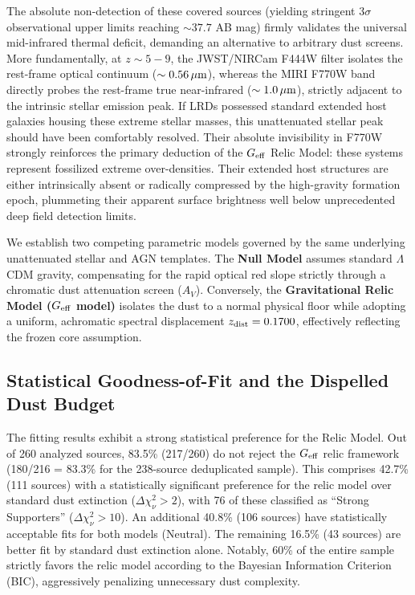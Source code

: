 \documentclass[twocolumn]{aastex631}
\begin{document}
The absolute non-detection of these covered sources (yielding stringent $3\sigma$ observational upper limits reaching $\sim 37.7$ AB mag) firmly validates the universal mid-infrared thermal deficit, demanding an alternative to arbitrary dust screens. More fundamentally, at $z \sim 5-9$, the JWST/NIRCam F444W filter isolates the rest-frame optical continuum ($\sim 0.56\rm\,\mu m$), whereas the MIRI F770W band directly probes the rest-frame true near-infrared ($\sim 1.0\rm\,\mu m$), strictly adjacent to the intrinsic stellar emission peak. If LRDs possessed standard extended host galaxies housing these extreme stellar masses, this unattenuated stellar peak should have been comfortably resolved. Their absolute invisibility in F770W strongly reinforces the primary deduction of the $G_{\rm eff}$ Relic Model: these systems represent fossilized extreme over-densities. Their extended host structures are either intrinsically absent or radically compressed by the high-gravity formation epoch, plummeting their apparent surface brightness well below unprecedented deep field detection limits. 

We establish two competing parametric models governed by the same underlying unattenuated stellar and AGN templates. The \textbf{Null Model} assumes standard $\Lambda$CDM gravity, compensating for the rapid optical red slope strictly through a chromatic dust attenuation screen ($A_V$). Conversely, the \textbf{Gravitational Relic Model ($G_{\rm eff}$ model)} isolates the dust to a normal physical floor while adopting a uniform, achromatic spectral displacement $z_{\rm dist} = 0.1700$, effectively reflecting the frozen core assumption.  

\subsection{Statistical Goodness-of-Fit and the Dispelled Dust Budget}

The fitting results exhibit a strong statistical preference for the Relic Model. Out of 260 analyzed sources, 83.5\% (217/260) do not reject the $G_{\rm eff}$ relic framework (180/216 = 83.3\% for the 238-source deduplicated sample). This comprises 42.7\% (111 sources) with a statistically significant preference for the relic model over standard dust extinction ($\Delta\chi^2_{\nu} > 2$), with 76 of these classified as ``Strong Supporters'' ($\Delta\chi^2_{\nu} > 10$). An additional 40.8\% (106 sources) have statistically acceptable fits for both models (Neutral). The remaining 16.5\% (43 sources) are better fit by standard dust extinction alone. Notably, 60\% of the entire sample strictly favors the relic model according to the Bayesian Information Criterion (BIC), aggressively penalizing unnecessary dust complexity.
\end{document}
